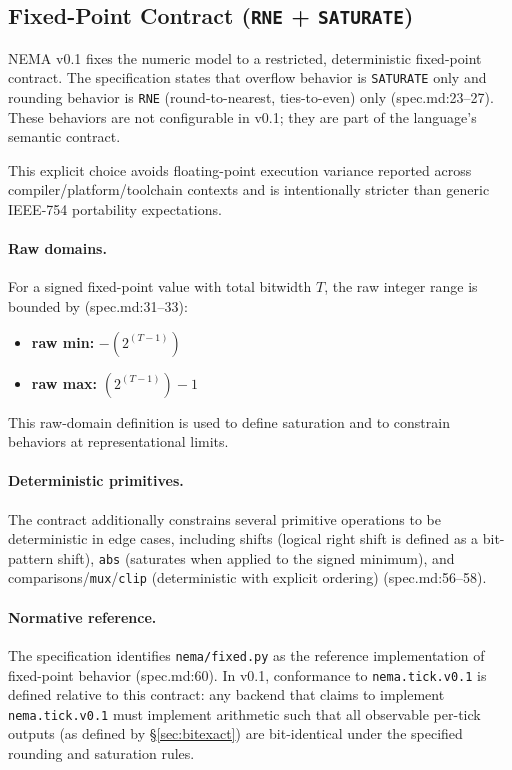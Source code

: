 \subsection{Fixed-Point Contract (\texttt{RNE} + \texttt{SATURATE})}
\label{sec:fixedpoint}
NEMA v0.1 fixes the numeric model to a restricted, deterministic fixed-point contract. The specification states that overflow behavior is \texttt{SATURATE} only and rounding behavior is \texttt{RNE} (round-to-nearest, ties-to-even) only (spec.md:23–27). These behaviors are not configurable in v0.1; they are part of the language’s semantic contract.

This explicit choice avoids floating-point execution variance reported across compiler/platform/toolchain contexts and is intentionally stricter than generic IEEE-754 portability expectations.

\paragraph{Raw domains.}
For a signed fixed-point value with total bitwidth $T$, the raw integer range is bounded by (spec.md:31–33):
\begin{itemize}
\item \textbf{raw min:} $-(2^{(T-1)})$
\item \textbf{raw max:} $(2^{(T-1)}) - 1$
\end{itemize}
This raw-domain definition is used to define saturation and to constrain behaviors at representational limits.

\paragraph{Deterministic primitives.}
The contract additionally constrains several primitive operations to be deterministic in edge cases, including shifts (logical right shift is defined as a bit-pattern shift), \texttt{abs} (saturates when applied to the signed minimum), and comparisons/\texttt{mux}/\texttt{clip} (deterministic with explicit ordering) (spec.md:56–58).

\paragraph{Normative reference.}
The specification identifies \texttt{nema/fixed.py} as the reference implementation of fixed-point behavior (spec.md:60). In v0.1, conformance to \texttt{nema.tick.v0.1} is defined relative to this contract: any backend that claims to implement \texttt{nema.tick.v0.1} must implement arithmetic such that all observable per-tick outputs (as defined by §\ref{sec:bitexact}) are bit-identical under the specified rounding and saturation rules.

